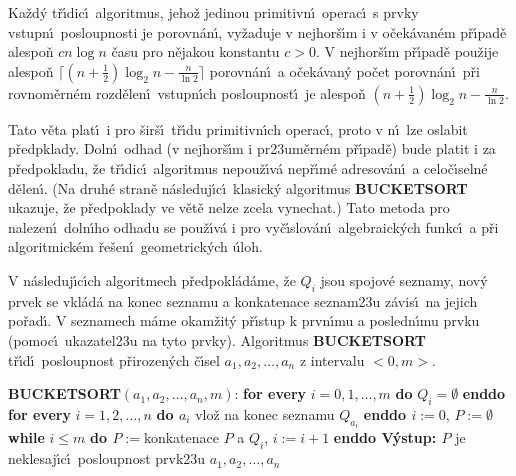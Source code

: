 \documentclass[a4paper,12pt]{article}
\begin{document}
Ka\v zd\'y t\v r\'\i dic\'\i\ algoritmus, jeho\v z jedinou 
primitivn\'\i\ ope\-rac\'\i\ s prvky vstupn\'\i\ posloupnosti je 
porovn\'an\'\i , vy\v zaduje v nejhor\v s\'\i m i v o\v cek\'avan\'em p\v r\'\i pad\v e 
alespo\v n $cn\log n$ \v casu pro n\v ejakou konstantu $c>0$.  V 
nejhor\v s\'\i m p\v r\'\i pad\v e pou\v zije alespo\v n $\lceil 
(n+\frac 12)\log_2n-\frac n{\ln2}\rceil$ 
porovn\'an\'\i\ a o\v cek\'avan\'y po\v cet porovn\'an\'\i\ p\v ri rovnom\v ern\'em 
rozd\v elen\'\i\ vstupn\'\i ch posloupnost\'\i\ je alespo\v n 
$(n+\frac 12)\log_2n-\frac n{\ln2}$.  
\endproclaim
\medskip

\flushpar Tato v\v eta 
plat\'\i\ i pro \v sir\v s\'\i\ t\v r\'\i du primitivn\'\i ch operac\'\i , proto v n\'\i\ 
lze oslabit p\v redpklady. 
Doln\'\i\ odhad (v nejhor\v s\'\i m i pr\accent23um\v ern\'em p\v r\'\i pad\v e) 
bude platit i za 
p\v red\-pokladu, \v ze t\v r\'\i dic\'\i\ algoritmus nepou\v z\'\i v\'a nep\v r\'\i m\'e 
adreso\-v\'an\'\i\ a celo\-\v c\'\i seln\'e d\v elen\'\i . 
(Na druh\'e stran\v e n\'asleduj\'\i c\'\i\ klasick\'y algoritmus 
{\bf BUCKETSORT} ukazuje, \v ze p\v red\-poklady
ve v\v et\v e nelze zcela vynechat.) 
Tato metoda pro 
nalezen\'\i\ doln\'\i ho odhadu se pou\v z\'\i v\'a i pro vy\v c\'\i slov\'an\'\i\ 
algebraick\'ych funkc\'\i\ a p\v ri algoritmick\'em \v re\v sen\'\i\ 
geometrick\'ych \'uloh.
\bigskip

\centerline{}
\bigskip


\flushpar V n\'asleduj\'\i c\'\i ch algoritmech 
p\v red\-po\-kl\'a\-d\'ame, \v ze $Q_i$ jsou spojov\'e seznamy, nov\'y 
prvek se vkl\'ad\'a na konec seznamu a konkatenace 
seznam\accent23u z\'avis\'\i\ na jejich po\v rad\'\i . V 
seznamech m\'ame okam\v zit\'y p\v r\'\i stup k prvn\'\i mu a posledn\'\i mu 
prvku (pomoc\'\i\ ukazatel\accent23u na tyto prvky). 
Algoritmus {\bf BUCKETSORT} t\v r\'\i d\'\i\ posloupnost p\v rirozen\'ych 
\v c\'\i sel $a_1,a_2,\dots,a_n$ z intervalu $<0,m>$.
\bigskip

{\bf BUCKETSORT$(a_1,a_2,\dots,a_n,m)$}:\newline 
{\bf for every} $i=0,1,\dots,m$ {\bf do} $Q_i=\emptyset$ {\bf enddo\newline 
for every} $i=1,2,\dots,n$ {\bf do\newline 
\phantom{{\rm ---}}$a_i$} vlo\v z na konec seznamu $Q_{a_i}$\newline 
{\bf enddo\newline 
$i:=0$}, $P:=\emptyset$\newline 
{\bf while} $i\le m$ {\bf do\newline 
\phantom{{\rm ---}}$P:=$}konkatenace $P$ a $Q_i$, $i:=i+1$\newline 
{\bf enddo\newline 
V\'ystup: $P$} je neklesaj\'\i c\'\i\ posloupnost prvk\accent23u 
$a_1,a_2,\dots,a_n$
\bigskip
\end{document}
